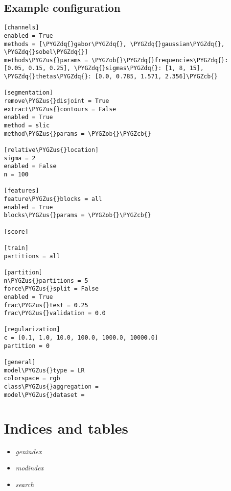 \documentclass[letterpaper,10pt,english]{sphinxmanual}
\def\PYGZus{\char`\_}
\def\PYGZob{\char`\{}
\def\PYGZcb{\char`\}}
\def\PYGZdq{\char`\"}
\begin{document}
\section{Example configuration}
\label{index:example-configuration}
\begin{Verbatim}[commandchars=\\\{\}]
[channels]
enabled = True
methods = [\PYGZdq{}gabor\PYGZdq{}, \PYGZdq{}gaussian\PYGZdq{}, \PYGZdq{}sobel\PYGZdq{}]
methods\PYGZus{}params = \PYGZob{}\PYGZdq{}frequencies\PYGZdq{}: [0.05, 0.15, 0.25], \PYGZdq{}sigmas\PYGZdq{}: [1, 8, 15], \PYGZdq{}thetas\PYGZdq{}: [0.0, 0.785, 1.571, 2.356]\PYGZcb{}

[segmentation]
remove\PYGZus{}disjoint = True
extract\PYGZus{}contours = False
enabled = True
method = slic
method\PYGZus{}params = \PYGZob{}\PYGZcb{}

[relative\PYGZus{}location]
sigma = 2
enabled = False
n = 100

[features]
feature\PYGZus{}blocks = all
enabled = True
blocks\PYGZus{}params = \PYGZob{}\PYGZcb{}

[score]

[train]
partitions = all

[partition]
n\PYGZus{}partitions = 5
force\PYGZus{}split = False
enabled = True
frac\PYGZus{}test = 0.25
frac\PYGZus{}validation = 0.0

[regularization]
c = [0.1, 1.0, 10.0, 100.0, 1000.0, 10000.0]
partition = 0

[general]
model\PYGZus{}type = LR
colorspace = rgb
class\PYGZus{}aggregation = 
model\PYGZus{}dataset =
\end{Verbatim}


\chapter{Indices and tables}
\label{index:indices-and-tables}\begin{itemize}
\item {} 
\emph{genindex}

\item {} 
\emph{modindex}

\item {} 
\emph{search}

\end{itemize}
\end{document}
